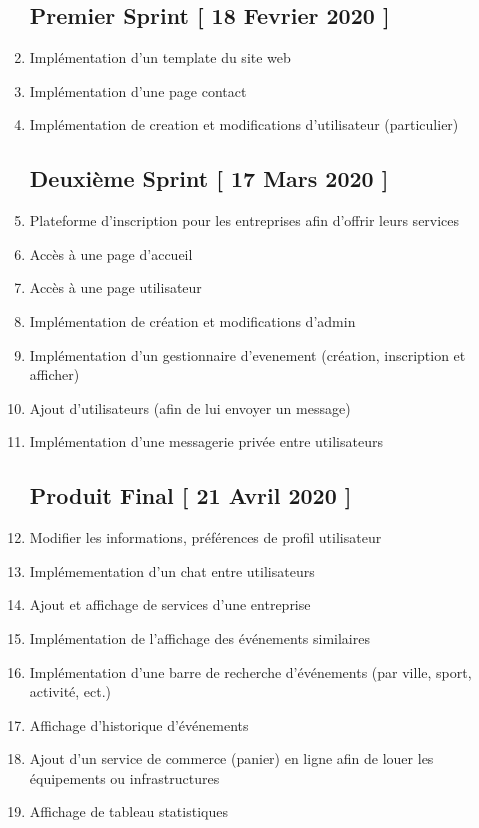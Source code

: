 \documentclass[letter,12pt]{exam}
\begin{document}
\begin{enumerate}

\subsection{Premier Sprint {[} 18 Fevrier 2020
{]}}\label{premier-sprint-18-fevrier-2020}


\tightlist
\item
  Implémentation d'un template du site web
\item
  Implémentation d'une page contact
\item
  Implémentation de creation et modifications d'utilisateur
  (particulier)

\subsection{Deuxième Sprint {[} 17 Mars 2020
{]}}\label{deuxieme-sprint-17-mars-2020}

\item
  Plateforme d'inscription pour les entreprises afin d'offrir leurs
  services
\item
  Accès à une page d'accueil
\item
  Accès à une page utilisateur
\item
  Implémentation de création et modifications d'admin
\item
  Implémentation d'un gestionnaire d'evenement (création, inscription et
  afficher)
\item
  Ajout d'utilisateurs (afin de lui envoyer un message)
\item
  Implémentation d'une messagerie privée entre utilisateurs


\subsection{Produit Final {[} 21 Avril 2020
{]}}\label{produit-final-21-avril-2020}


\item
  Modifier les informations, préférences de profil utilisateur
\item
  Implémementation d'un chat entre utilisateurs
\item
  Ajout et affichage de services d'une entreprise
\item
  Implémentation de l'affichage des événements similaires
\item
  Implémentation d'une barre de recherche d'événements (par ville,
  sport, activité, ect.)
\item
  Affichage d'historique d'événements
\item
  Ajout d'un service de commerce (panier) en ligne afin de louer les équipements ou infrastructures
\item
  Affichage de tableau statistiques
\end{enumerate}
\end{document}

